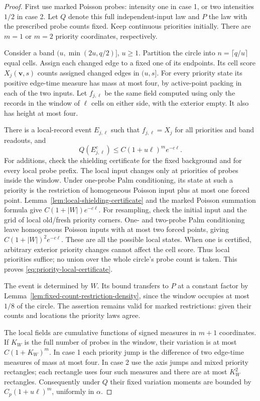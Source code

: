 \documentclass[11pt,letterpaper]{article}
\begin{document}
\begin{proof}
First use marked Poisson probes: intensity one in case 1,
or two intensities $1/2$ in case 2.
Let $Q$ denote this full independent-input law and $P$
the law with the prescribed probe counts fixed.
Keep continuous priorities initially. There are $m=1$ or
$m=2$ priority coordinates, respectively.

Consider a band $(u,\min(2u,q/2)]$, $u\ge1$.
Partition the circle into $n=\lceil q/u\rceil$ equal cells.
Assign each changed edge to a fixed one of its endpoints.
Its cell score $X_j(\boldsymbol v,s)$ counts assigned
changed edges in $(u,s]$. For every priority state its
positive edge-time measure has mass at most four, by
active-point packing in each of the two inputs.
Let $f_{j,\ell}$ be the same field computed using only
the records in the window of $\ell$ cells on either side,
with the exterior empty. It also has height at most four.

There is a local-record event $E_{j,\ell}$ such that
$f_{j,\ell}=X_j$ for all priorities and band readouts,
and
\begin{equation}\label{eq:priority-local-certificate}
 Q(E_{j,\ell}^c)\le C(1+u\ell)^m e^{-c\ell}.
\end{equation}
For additions, check the shielding certificate for the
fixed background and for every local probe prefix.
The local input changes only at priorities of probes
inside the window. Under one-probe Palm conditioning,
its state at such a priority is the restriction of
homogeneous Poisson input plus at most one forced point.
Lemma~\ref{lem:local-shielding-certificate} and the marked
Poisson summation formula give
$C(1+|W|)e^{-c\ell}$.
For resampling, check the initial input and the grid of
local old/fresh priority corners. One- and two-probe Palm
conditioning leave homogeneous Poisson inputs with at most
two forced points, giving $C(1+|W|)^2e^{-c\ell}$.
These are all the possible local states.
When one is certified, arbitrary exterior priority changes
cannot affect the cell score. Thus local priorities suffice;
no union over the whole circle's probe count is taken.
This proves \eqref{eq:priority-local-certificate}.

The event is determined by $W$. Its bound transfers to
$P$ at a constant factor by
Lemma~\ref{lem:fixed-count-restriction-density}, since
the window occupies at most $1/8$ of the circle.
The assertion remains valid for marked restrictions:
given their counts and locations the priority laws agree.

The local fields are cumulative functions of signed
measures in $m+1$ coordinates. If $K_W$ is the full number
of probes in the window, their variation is at most
$C(1+K_W)^m$. In case 1 each priority jump is the difference
of two edge-time measures of mass at most four.
In case 2 use the axis jumps and mixed priority rectangles;
each rectangle uses four such measures and there are at
most $K_W^2$ rectangles.
Consequently under $Q$ their fixed variation moments are
bounded by $C_p(1+u\ell)^m$, uniformly in $\alpha$.


\end{proof}
\end{document}
